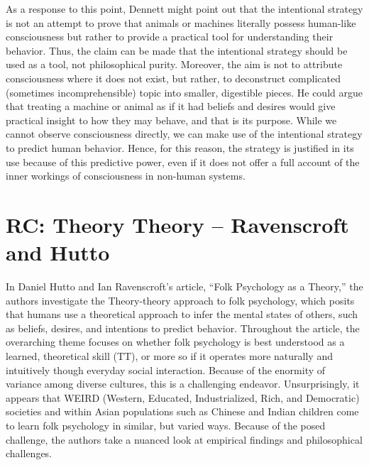 \documentclass[11pt]{article}
\begin{document}
As a response to this point, Dennett might point out that the intentional strategy is not an attempt to prove that animals or machines literally possess human-like consciousness but rather to provide a practical tool for understanding their behavior. Thus, the claim can be made that the intentional strategy should be used as a tool, not philosophical purity. Moreover, the aim is not to attribute consciousness where it does not exist, but rather, to deconstruct complicated (sometimes incomprehensible) topic into smaller, digestible pieces. He could argue that treating a machine or animal as if it had beliefs and desires would give practical insight to how they may behave, and that is its purpose. While we cannot observe consciousness directly, we can make use of the intentional strategy to predict human behavior. Hence, for this reason, the strategy is justified in its use because of this predictive power, even if it does not offer a full account of the inner workings of consciousness in non-human systems.

\section{RC: Theory Theory -- Ravenscroft and Hutto}
    
In Daniel Hutto and Ian Ravenscroft's article, ``Folk Psychology as a Theory,'' the authors investigate the Theory-theory approach to folk psychology, which posits that humans use a theoretical approach to infer the mental states of others, such as beliefs, desires, and intentions to predict behavior. Throughout the article, the overarching theme focuses on whether folk psychology is best understood as a learned, theoretical skill (TT), or more so if it operates more naturally and intuitively though everyday social interaction. Because of the enormity of variance among diverse cultures, this is a challenging endeavor. Unsurprisingly, it appears that WEIRD (Western, Educated, Industrialized, Rich, and Democratic) societies and within Asian populations such as Chinese and Indian children come to learn folk psychology in similar, but varied ways. Because of the posed challenge, the authors take a nuanced look at empirical findings and philosophical challenges.
\end{document}
